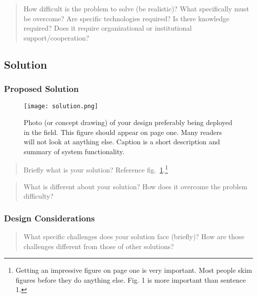 \documentclass[
  10pt,
  draftcls,
  technote,
  letterpaper,
  oneside,
  onecolumn]{IEEEtran}
\begin{document}
\begin{quote}
How difficult is the problem to solve (be realistic)? What specifically
must be overcome? Are specific technologies required? Is there knowledge
required? Does it require organizational or institutional
support/cooperation?
\end{quote}

\hypertarget{solution}{%
\subsection{Solution}\label{solution}}

\hypertarget{proposed-solution}{%
\subsubsection{Proposed Solution}\label{proposed-solution}}

\begin{figure}
\hypertarget{fig:solution}{%
\centering
\texttt{[image: solution.png]}
\caption{Photo (or concept drawing) of your design preferably being
deployed in the field. This figure should appear on page one. Many
readers will not look at anything else. Caption is a short description
and summary of system functionality.}\label{fig:solution}
}
\end{figure}

\begin{quote}
Briefly what is your solution? Reference
fig.~\ref{fig:solution}.\footnote{Getting an impressive figure on page
  one is very important. Most people skim figures before they do
  anything else. Fig. 1 is more important than sentence 1.}
\end{quote}

\begin{quote}
What is different about your solution? How does it overcome the problem
difficulty?
\end{quote}

\hypertarget{design-considerations}{%
\subsubsection{Design Considerations}\label{design-considerations}}

\begin{quote}
What specific challenges does your solution face (briefly)? How are
those challenges different from those of other solutions?
\end{quote}
\end{document}
